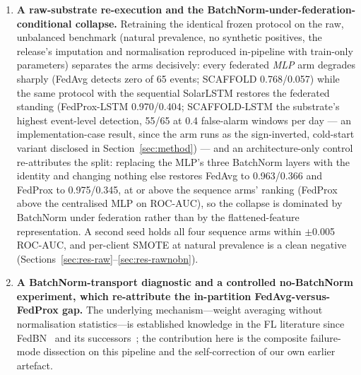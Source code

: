 \begin{enumerate}[leftmargin=2em, itemsep=3pt]
  temporally-preceding fold (training partitions 1--4, single-pass
  test on partition 5, natural 1.31\% prevalence), all arms
  generalise (ROC-AUC 0.906--0.978); the in-partition
  federated-versus-centralised gap disappears (FedProx 0.976/0.308
  vs architecture-matched centralised MLP 0.973/0.382); the
  threshold-transfer and calibration failures persist; and an
  event-level evaluation on 65 physical M/X-class events shows
  detection is not the deployability boundary---XGBoost's false-alarm
  burden is roughly $7\times$ lower than every neural arm's
  (Section~\ref{sec:res-leakfree}).
  \item \textbf{A raw-substrate re-execution and the
  BatchNorm-under-federation-conditional collapse.} Retraining the
  identical frozen protocol on the raw, unbalanced benchmark (natural
  prevalence, no synthetic positives, the
  release's imputation and normalisation reproduced in-pipeline with
  train-only parameters) separates the arms decisively: every
  federated \emph{MLP} arm degrades sharply (FedAvg detects zero of 65
  events; SCAFFOLD 0.768/0.057) while the same protocol with the
  sequential SolarLSTM restores the federated standing (FedProx-LSTM
  0.970/0.404; SCAFFOLD-LSTM the substrate's highest event-level
  detection, 55/65 at 0.4 false-alarm windows per day --- an
  implementation-case result, since the arm runs as the sign-inverted,
  cold-start variant disclosed in Section~\ref{sec:method}) --- and an
  architecture-only control re-attributes the split: replacing the
  MLP's three BatchNorm layers with the identity and changing nothing
  else restores FedAvg to 0.963/0.366 and FedProx to 0.975/0.345, at
  or above the sequence arms' ranking (FedProx above the centralised
  MLP on ROC-AUC), so the collapse is dominated by BatchNorm under
  federation rather than by the flattened-feature representation.
  A second seed
  holds all four sequence arms within $\pm$0.005 ROC-AUC, and
  per-client SMOTE at natural prevalence is a clean negative
  (Sections~\ref{sec:res-raw}--\ref{sec:res-rawnobn}).
  \item \textbf{A BatchNorm-transport diagnostic and a controlled
  no-BatchNorm experiment, which re-attribute the in-partition
  FedAvg-versus-FedProx gap.} The underlying mechanism---weight
  averaging without normalisation statistics---is established
  knowledge in the FL literature since FedBN~\cite{li2021fedbn} and
  its successors~\cite{wang2023bn,guerraoui2024bn,bnscaffold2024};
  the contribution here is the composite failure-mode dissection on
  this pipeline and the self-correction of our own earlier artefact.

\end{enumerate}

